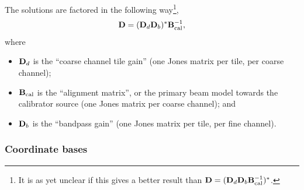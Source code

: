 \documentclass{book}
\begin{document}
The solutions are factored in the following way\footnote{It is as yet unclear if this gives a better result than ${\bf D} = ({\bf D}_d {\bf D}_b {\bf B}_\text{cal}^{-1})^*$.},
\begin{equation}
    {\bf D} = ({\bf D}_d {\bf D}_b)^* {\bf B}_\text{cal}^{-1},
    \label{eqn:rts_factorisation}
\end{equation}
where
\begin{itemize}
    \item ${\bf D}_d$ is the ``coarse channel tile gain'' (one Jones matrix per tile, per coarse channel);
    \item ${\bf B}_\text{cal}$ is the ``alignment matrix'', or the primary beam model towards the calibrator source (one Jones matrix per coarse channel); and
    \item ${\bf D}_b$ is the ``bandpass gain'' (one Jones matrix per tile, per fine channel).
\end{itemize}

\subsubsection{Coordinate bases}
\end{document}
